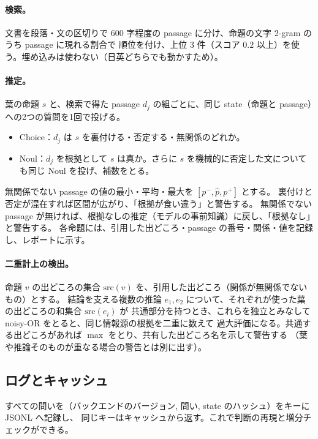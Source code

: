 \documentclass[a4paper,11pt]{ltjsarticle}
\begin{document}
\paragraph{検索。}
文書を段落・文の区切りで $600$ 字程度の passage に分け、命題の文字 2-gram のうち passage に現れる割合で
順位を付け、上位 $3$ 件（スコア $0.2$ 以上）を使う。埋め込みは使わない（日英どちらでも動かすため）。

\paragraph{推定。}
葉の命題 $s$ と、検索で得た passage $d_j$ の組ごとに、同じ state（命題と passage）への2つの質問を1回で投げる。
\begin{itemize}
  \item Choice：$d_j$ は $s$ を裏付ける・否定する・無関係のどれか。
  \item Noul：$d_j$ を根拠として $s$ は真か。さらに $s$ を機械的に否定した文についても同じ Noul を投げ、補数をとる。
\end{itemize}
無関係でない passage の値の最小・平均・最大を $[p^-,\hat p,p^+]$ とする。
裏付けと否定が混在すれば区間が広がり、「根拠が食い違う」と警告する。
無関係でない passage が無ければ、根拠なしの推定（モデルの事前知識）に戻し、「根拠なし」と警告する。
各命題には、引用した出どころ・passage の番号・関係・値を記録し、レポートに示す。

\paragraph{二重計上の検出。}
命題 $v$ の出どころの集合 $\mathrm{src}(v)$ を、引用した出どころ（関係が無関係でないもの）とする。
結論を支える複数の推論 $e_1,e_2$ について、それぞれが使った葉の出どころの和集合 $\mathrm{src}(e_i)$ が
共通部分を持つとき、これらを独立とみなして noisy-OR をとると、同じ情報源の根拠を二重に数えて
過大評価になる。共通する出どころがあれば $\max$ をとり、共有した出どころ名を示して警告する
（葉や推論そのものが重なる場合の警告とは別に出す）。

\subsection{ログとキャッシュ}

すべての問いを（バックエンドのバージョン, 問い, state のハッシュ）をキーに JSONL へ記録し、
同じキーはキャッシュから返す。これで判断の再現と増分チェックができる。

\end{document}
